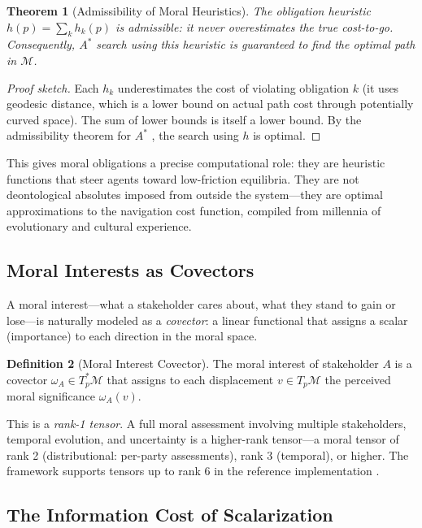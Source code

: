 \documentclass[12pt]{article}
\newtheorem{theorem}{Theorem}[section]
\theoremstyle{definition}
\newtheorem{definition}[theorem]{Definition}
\theoremstyle{remark}
\newcommand{\M}{\mathcal{M}}
\begin{document}
\begin{theorem}[Admissibility of Moral Heuristics]
\label{thm:admissible}
The obligation heuristic $h(p) = \sum_k h_k(p)$ is admissible: it never overestimates the true cost-to-go. Consequently, $A^*$ search using this heuristic is guaranteed to find the optimal path in $\M$.
\end{theorem}

\begin{proof}[Proof sketch]
Each $h_k$ underestimates the cost of violating obligation $k$ (it uses geodesic distance, which is a lower bound on actual path cost through potentially curved space). The sum of lower bounds is itself a lower bound. By the admissibility theorem for $A^*$ \citep{hart1968}, the search using $h$ is optimal.
\end{proof}

This gives moral obligations a precise computational role: they are heuristic functions that steer agents toward low-friction equilibria. They are not deontological absolutes imposed from outside the system---they are optimal approximations to the navigation cost function, compiled from millennia of evolutionary and cultural experience.

\subsection{Moral Interests as Covectors}

A moral interest---what a stakeholder cares about, what they stand to gain or lose---is naturally modeled as a \emph{covector}: a linear functional that assigns a scalar (importance) to each direction in the moral space.

\begin{definition}[Moral Interest Covector]
The moral interest of stakeholder $A$ is a covector $\omega_A \in T^*_p\M$ that assigns to each displacement $v \in T_p\M$ the perceived moral significance $\omega_A(v)$.
\end{definition}

This is a \emph{rank-1 tensor}. A full moral assessment involving multiple stakeholders, temporal evolution, and uncertainty is a higher-rank tensor---a moral tensor of rank 2 (distributional: per-party assessments), rank 3 (temporal), or higher. The framework supports tensors up to rank 6 in the reference implementation \citep{anon2026b}.

\subsection{The Information Cost of Scalarization}
\end{document}
